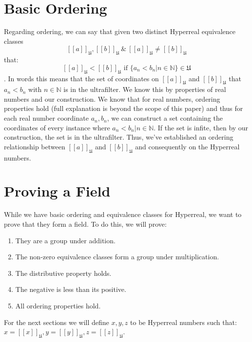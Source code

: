 \documentclass[12pt]{report}
\newcommand{\N}{\mathbb{N}}
\newcommand{\U}{\mathfrak{U}}
\begin{document}
\section*{Basic Ordering}
Regarding ordering, we can say that given two distinct Hyperreal equivalence classes \[  [[a]]_{\U}, [[b]]_{\U} \ \& \ [[a]]_{\U}\not= [[b]]_{\U} \] that: \[ [[a]]_{\U}< [[b]]_{\U} \text{ if }\{a_n < b_n | n \in \N \} \in \U \]. In words this means that the set of coordinates on $[[a]]_{\U}$ and $[[b]]_{\U}$ that $a_n < b_n$ with $n \in \N $ is in the ultrafilter.
We know this by properties of real numbers and our construction.
We know that for real numbers, ordering properties hold (full explanation is beyond the scope of this paper) and thus for each real number coordinate $a_n, b_n$, we can construct a set containing the coordinates of every instance where $a_n < b_n | n \in \N$.
If the set is infite, then by our construction, the set is in the ultrafilter.
Thus, we've established an ordering relationship between $[[a]]_{\U}$ and $[[b]]_{\U}$ and consequently on the Hyperreal numbers.

\section*{Proving a Field}
While we have basic ordering and equivalence classes for Hyperreal, we want to prove that they form a field.
To do this, we will prove:
\begin{enumerate}
    \item They are a group under addition.
    \item The non-zero equivalence classes form a group under multiplication.
    \item The distributive property holds.
    \item The negative is less than its positive.
    \item All ordering properties hold.
\end{enumerate}
For the next sections we will define $x,y,z$ to be Hyperreal numbers such that:\\ $x =[[x]]_{\U}, y= [[y]]_{\U}, z=[[z]]_{\U}$.
\end{document}
